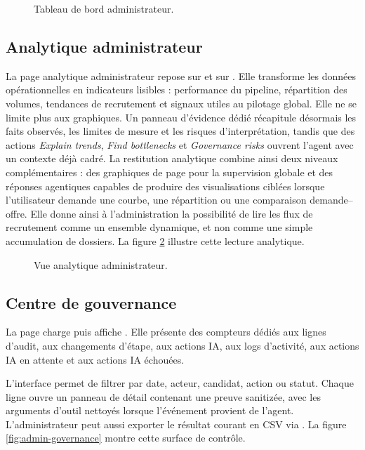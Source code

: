 \begin{figure}[H]
  \centering
  \caption{\label{fig:admin-dashboard}Tableau de bord administrateur.}
\end{figure}

\subsection{Analytique administrateur}
La page analytique administrateur repose sur  et sur . Elle transforme les données opérationnelles en indicateurs lisibles : performance du pipeline, répartition des volumes, tendances de recrutement et signaux utiles au pilotage global.
Elle ne se limite plus aux graphiques. Un panneau d'évidence dédié récapitule désormais les faits observés, les limites de mesure et les risques d'interprétation, tandis que des actions \textit{Explain trends}, \textit{Find bottlenecks} et \textit{Governance risks} ouvrent l'agent avec un contexte déjà cadré.
La restitution analytique combine ainsi deux niveaux complémentaires : des graphiques de page pour la supervision globale et des réponses agentiques capables de produire des visualisations ciblées lorsque l'utilisateur demande une courbe, une répartition ou une comparaison demande--offre.
Elle donne ainsi à l'administration la possibilité de lire les flux de recrutement comme un ensemble dynamique, et non comme une simple accumulation de dossiers. La figure \ref{fig:admin-analytics} illustre cette lecture analytique.

\begin{figure}[H]
  \centering
  \caption{\label{fig:admin-analytics}Vue analytique administrateur.}
\end{figure}

\subsection{Centre de gouvernance}
La page  charge  puis affiche . Elle présente des compteurs dédiés aux lignes d'audit, aux changements d'étape, aux actions IA, aux logs d'activité, aux actions IA en attente et aux actions IA échouées.

L'interface permet de filtrer par date, acteur, candidat, action ou statut. Chaque ligne ouvre un panneau de détail contenant une preuve sanitizée, avec les arguments d'outil nettoyés lorsque l'événement provient de l'agent. L'administrateur peut aussi exporter le résultat courant en CSV via . La figure \ref{fig:admin-governance} montre cette surface de contrôle.

